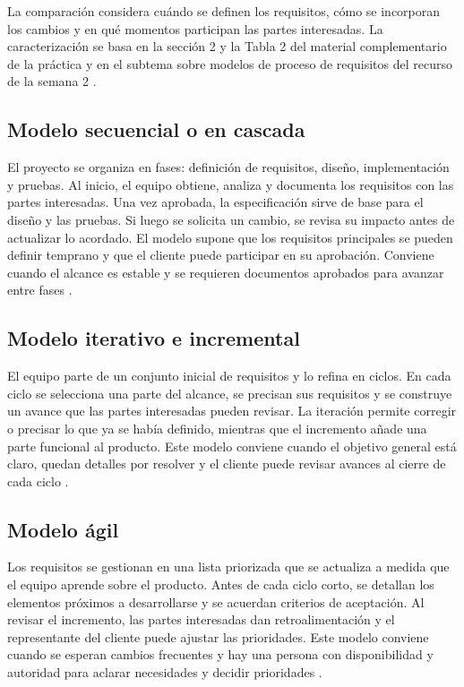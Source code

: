 \documentclass[11pt,a4paper]{article}
\begin{document}
La comparación considera cuándo se definen los requisitos, cómo se incorporan los cambios y en qué momentos participan las partes interesadas. La caracterización se basa en la sección 2 y la Tabla 2 del material complementario de la práctica \cite{materialGA} y en el subtema sobre modelos de proceso de requisitos del recurso de la semana 2 \cite[sec.~2.1.1]{recursoS2}.

\subsection{Modelo secuencial o en cascada}

El proyecto se organiza en fases: definición de requisitos, diseño, implementación y pruebas. Al inicio, el equipo obtiene, analiza y documenta los requisitos con las partes interesadas. Una vez aprobada, la especificación sirve de base para el diseño y las pruebas. Si luego se solicita un cambio, se revisa su impacto antes de actualizar lo acordado. El modelo supone que los requisitos principales se pueden definir temprano y que el cliente puede participar en su aprobación. Conviene cuando el alcance es estable y se requieren documentos aprobados para avanzar entre fases \cite{materialGA}.

\subsection{Modelo iterativo e incremental}

El equipo parte de un conjunto inicial de requisitos y lo refina en ciclos. En cada ciclo se selecciona una parte del alcance, se precisan sus requisitos y se construye un avance que las partes interesadas pueden revisar. La iteración permite corregir o precisar lo que ya se había definido, mientras que el incremento añade una parte funcional al producto. Este modelo conviene cuando el objetivo general está claro, quedan detalles por resolver y el cliente puede revisar avances al cierre de cada ciclo \cite{materialGA}.

\subsection{Modelo ágil}

Los requisitos se gestionan en una lista priorizada que se actualiza a medida que el equipo aprende sobre el producto. Antes de cada ciclo corto, se detallan los elementos próximos a desarrollarse y se acuerdan criterios de aceptación. Al revisar el incremento, las partes interesadas dan retroalimentación y el representante del cliente puede ajustar las prioridades. Este modelo conviene cuando se esperan cambios frecuentes y hay una persona con disponibilidad y autoridad para aclarar necesidades y decidir prioridades \cite{materialGA}.
\end{document}

